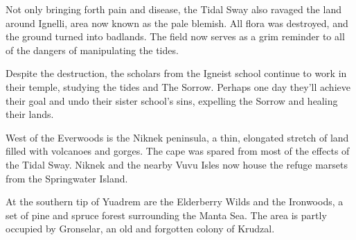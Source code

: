Not only bringing forth pain and disease, the Tidal Sway also ravaged the land around Ignelli, area now known as the pale blemish.
All flora was destroyed, and the ground turned into badlands.
The field now serves as a grim reminder to all of the dangers of manipulating the tides.

Despite the destruction, the scholars from the Igneist school continue to work in their temple, studying the tides and The Sorrow.
Perhaps one day they'll achieve their goal and undo their sister school's sins, expelling the Sorrow and healing their lands.

West of the Everwoods is the Niknek peninsula, a thin, elongated stretch of land filled with volcanoes and gorges.
The cape was spared from most of the effects of the Tidal Sway.
Niknek and the nearby Vuvu Isles now house the refuge marsets from the Springwater Island.

At the southern tip of Yuadrem are the Elderberry Wilds and the Ironwoods, a set of pine and spruce forest surrounding the Manta Sea.
The area is partly occupied by Gronselar, an old and forgotten colony of Krudzal.
